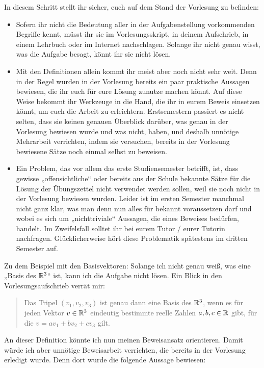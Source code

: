  
 \begin{de}
In diesem Schritt stellt ihr sicher, euch auf dem Stand der Vorlesung zu befinden:
\begin{itemize}
 \item Sofern ihr nicht die Bedeutung aller in der Aufgabenstellung vorkommenden Begriffe kennt, müsst ihr sie im Vorlesungsskript, in deinem Aufschrieb, in einem Lehrbuch oder im Internet nachschlagen. Solange ihr nicht genau wisst, was die Aufgabe besagt, könnt ihr sie nicht lösen.
 \item Mit den Definitionen allein kommt ihr meist aber noch nicht sehr weit. Denn in der Regel wurden in der Vorlesung bereits ein paar praktische Aussagen bewiesen, die ihr euch für eure Lösung zunutze machen könnt. Auf diese Weise bekommt ihr Werkzeuge in die Hand, die ihr in eurem Beweis einsetzen könnt, um euch die Arbeit zu erleichtern. Erstsemestern passiert es nicht selten, dass sie keinen genauen Überblick darüber, was genau in der Vorlesung bewiesen wurde und was nicht, haben, und deshalb unnötige Mehrarbeit verrichten, indem sie versuchen, bereits in der Vorlesung bewiesene Sätze noch einmal selbst zu beweisen.
 \item Ein Problem, das vor allem das erste Studiensemester betrifft, ist, dass gewisse „offensichtliche“ oder bereits aus der Schule bekannte Sätze für die Lösung der Übungszettel nicht verwendet werden sollen, weil sie noch nicht in der Vorlesung bewiesen wurden. Leider ist im ersten Semester manchmal nicht ganz klar, was man denn nun alles für bekannt voraussetzen darf und wobei es sich um „nichttriviale“ Aussagen, die eines Beweises bedürfen, handelt. Im Zweifelsfall solltet ihr bei eurem Tutor / eurer Tutorin nachfragen. Glücklicherweise hört diese Problematik spätestens im dritten Semester auf.
\end{itemize}
Zu dem Beispiel mit den Basisvektoren: Solange ich nicht genau weiß, was eine „Basis des ${\mathbb R}^3$“ ist, kann ich die Aufgabe nicht lösen. Ein Blick in den Vorlesungsaufschrieb verrät mir:
  \begin{quote}
   Das Tripel $(v_1,v_2,v_3)$ ist genau dann eine Basis des ${\mathbb R}^3$, wenn es für jeden Vektor $v\in {\mathbb R}^3$ eindeutig bestimmte reelle Zahlen $a,b,c\in {\mathbb R}$ gibt, für die $v=av_1+bv_2+cv_3$ gilt.
  \end{quote}
 An dieser Definition könnte ich nun meinen Beweisansatz orientieren. Damit würde ich aber unnötige Beweisarbeit verrichten, die bereits in der Vorlesung erledigt wurde. Denn dort wurde die folgende Aussage bewiesen:

\end{de}
